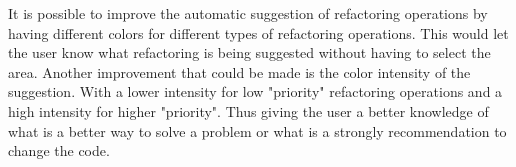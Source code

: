 

It is possible to improve the automatic suggestion of refactoring operations by
having different colors for different types of refactoring operations.
This would let the user know what refactoring is being suggested without having to
select the area.
Another improvement that could be made is the color intensity of the suggestion.
With a lower intensity for low "priority" refactoring operations and a high intensity
for higher "priority". Thus giving the user a better knowledge of what is a better
way to solve a problem or what is a strongly recommendation to change the code.
